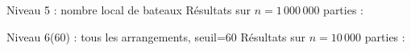 \begin{frame}{Niveau 5 : nombre local de bateaux}
Résultats sur $n=1\,000\,000$ parties :
\begin{center}
\end{center}
\end{frame}

\begin{frame}{Niveau 6(60) : tous les arrangements, seuil=60}
Résultats sur $n=10\,000$ parties :
\begin{center}
\end{center}
\end{frame}

